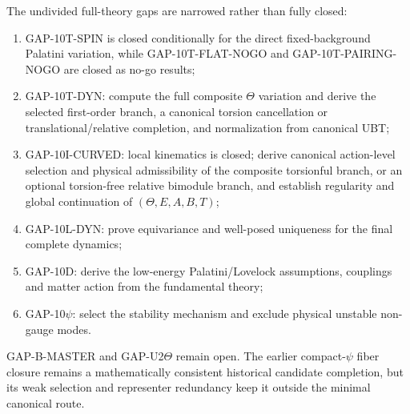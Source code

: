 The undivided full-theory gaps are narrowed rather than fully closed:
\begin{enumerate}
 \item GAP-10T-SPIN is closed conditionally for the direct fixed-background
       Palatini variation, while GAP-10T-FLAT-NOGO and
       GAP-10T-PAIRING-NOGO are closed as no-go results;
 \item GAP-10T-DYN: compute the full composite $\Theta$ variation and derive
       the selected first-order branch, a canonical torsion cancellation or
       translational/relative completion, and normalization from canonical UBT;
 \item GAP-10I-CURVED: local kinematics is closed; derive canonical
       action-level selection and physical admissibility of the composite
       torsionful branch, or an optional torsion-free relative bimodule branch,
       and establish regularity and global continuation of
       $(\Theta,E,A,B,T)$;
 \item GAP-10L-DYN: prove equivariance and well-posed uniqueness for the final
       complete dynamics;
 \item GAP-10D: derive the low-energy Palatini/Lovelock assumptions, couplings
       and matter action from the fundamental theory;
 \item GAP-10$\psi$: select the stability mechanism and exclude physical
       unstable non-gauge modes.
\end{enumerate}
GAP-B-MASTER and GAP-U2$\Theta$ remain open. The earlier compact-$\psi$ fiber
closure remains a mathematically consistent historical candidate completion,
but its weak selection and representer redundancy keep it outside the minimal
canonical route.
